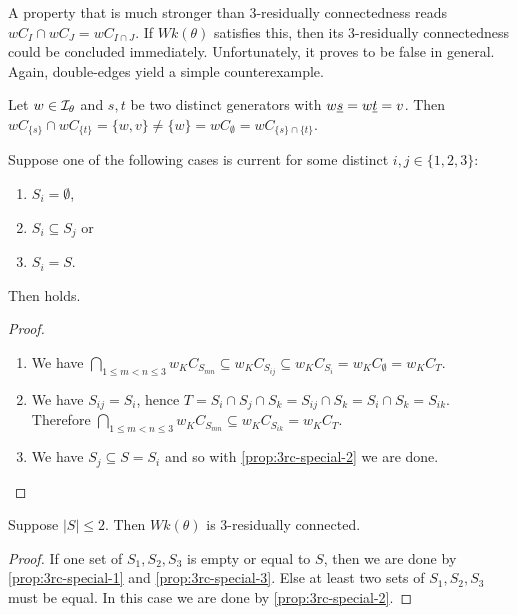 A property that is much stronger than 3-residually connectedness reads $wC_I \cap wC_J = wC_{I \cap J}$. If $Wk(\theta)$ satisfies this, then its 3-residually connectedness could be concluded immediately. Unfortunately, it proves to be false in general. Again, double-edges yield a simple counterexample.

\begin{exam}
	Let $w \in \mathcal{I}_{\theta}$ and $s,t$ be two distinct generators with $w \underline{s} = w \underline{t} = v$. Then $wC_{\{s\}} \cap wC_{\{t\}} = \{w,v\} \neq \{w\} = wC_{\emptyset} = wC_{\{s\} \cap \{t\}}$.
\end{exam}

\begin{prop}
	Suppose one of the following cases is current for some distinct $i,j \in \{1,2,3\}$:
	\begin{enumerate}
		\item \label{prop:3rc-special-1} $S_i = \emptyset$,
		\item \label{prop:3rc-special-2} $S_i \subseteq S_j$ or
		\item \label{prop:3rc-special-3} $S_i = S$.
	\end{enumerate}
	Then  holds.

	\begin{proof}
		\begin{enumerate}
			\item We have $\bigcap_{1 \leq m < n \leq 3} w_K C_{S_{mn}} \subseteq w_K C_{S_{ij}} \subseteq w_K C_{S_{i}} = w_K C_\emptyset = w_K C_T$.
			\item We have $S_{ij} = S_i$, hence $T = S_i \cap S_j \cap S_k = S_{ij} \cap S_k = S_i \cap S_k = S_{ik}$. Therefore $\bigcap_{1 \leq m < n \leq 3} w_K C_{S_{mn}} \subseteq w_K C_{S_{ik}} = w_K C_T$.
			\item We have $S_j \subseteq S = S_i$ and so with \ref{prop:3rc-special-2} we are done. \qedhere
		\end{enumerate}
	\end{proof}
\end{prop}

\begin{coro}
	Suppose $|S| \leq 2$. Then $Wk(\theta)$ is 3-residually connected.

	\begin{proof}
		If one set of $S_1,S_2,S_3$ is empty or equal to $S$, then we are done by \ref{prop:3rc-special-1} and \ref{prop:3rc-special-3}. Else at least two sets of $S_1,S_2,S_3$ must be equal. In this case we are done by \ref{prop:3rc-special-2}.
	\end{proof}
\end{coro}

